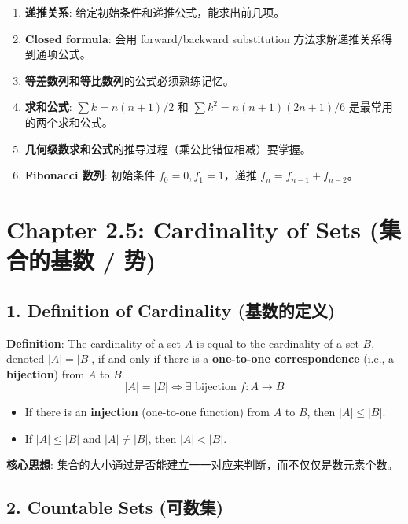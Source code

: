 \documentclass[10pt,a4paper,openany]{ctexbook}
\theoremstyle{definition}
\theoremstyle{remark}
\renewenvironment{quote}
  {\list{}{\leftmargin=1em\rightmargin=0pt\topsep=0.5pt\partopsep=0pt}\item[]}
  {\endlist}
\begin{document}
\begin{enumerate}
\item \textbf{递推关系}: 给定初始条件和递推公式，能求出前几项。
\item \textbf{Closed formula}: 会用 forward/backward substitution 方法求解递推关系得到通项公式。
\item \textbf{等差数列和等比数列}的公式必须熟练记忆。
\item \textbf{求和公式}: $\sum k = n(n+1)/2$ 和 $\sum k^2 = n(n+1)(2n+1)/6$ 是最常用的两个求和公式。
\item \textbf{几何级数求和公式}的推导过程（乘公比错位相减）要掌握。
\item \textbf{Fibonacci 数列}: 初始条件 $f_0=0, f_1=1$，递推 $f_n = f_{n-1}+f_{n-2}$。

\end{enumerate}


\section{Chapter 2.5: Cardinality of Sets (集合的基数 / 势)}

\vspace{-2pt}

\subsection{1. Definition of Cardinality (基数的定义)}

\textbf{Definition}: The cardinality of a set $A$ is equal to the cardinality of a set $B$, denoted $|A| = |B|$, if and only if there is a \textbf{one-to-one correspondence} (i.e., a \textbf{bijection}) from $A$ to $B$.
\[
|A| = |B| \iff \exists \text{ bijection } f: A \to B
\]

\begin{itemize}
\item If there is an \textbf{injection} (one-to-one function) from $A$ to $B$, then $|A| \le |B|$.
\item If $|A| \le |B|$ and $|A| \neq |B|$, then $|A| < |B|$.

\end{itemize}

\begin{quote}
\textbf{核心思想}: 集合的大小通过是否能建立一一对应来判断，而不仅仅是数元素个数。

\end{quote}
\vspace{-2pt}

\subsection{2. Countable Sets (可数集)}
\end{document}
